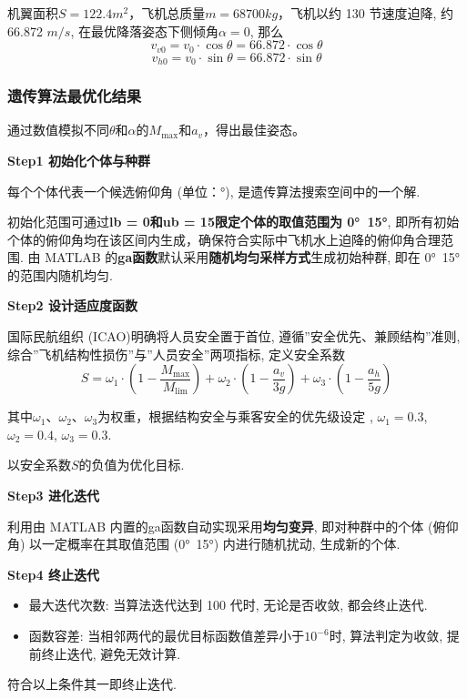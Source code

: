 \documentclass{cumcmthesis}
\begin{document}
机翼面积$S=122.4 m^2$，飞机总质量$ m = 68700 kg $，飞机以约 130 节速度迫降, 约66.872 $m/s$, 在最优降落姿态下侧倾角$\alpha = 0 $, 那么
\begin{equation}
    v_{v0} = v_0 \cdot \cos\theta = 66.872 \cdot \cos\theta
    \label{specfica_v}
\end{equation}
\begin{equation}
     v_{h0} = v_0 \cdot \sin\theta = 66.872 \cdot \sin\theta
    \label{specfica_h}
\end{equation}


\subsubsection{遗传算法最优化结果}


通过数值模拟不同$\theta$和$\alpha$的$M_{\text{max}}$和$a_v$，得出最佳姿态。

\textbf{Step1 初始化个体与种群}

每个个体代表一个候选俯仰角 (单位：°), 是遗传算法搜索空间中的一个解. 

初始化范围可通过\textbf{lb = 0和ub = 15限定个体的取值范围为 0°~15°}, 
即所有初始个体的俯仰角均在该区间内生成，确保符合实际中飞机水上迫降的俯仰角合理范围.  
由 MATLAB 的\textbf{ga函数}默认采用\textbf{随机均匀采样方式}生成初始种群, 即在 0°~15° 的范围内随机均匀. 

\textbf{Step2 设计适应度函数}

国际民航组织 (ICAO)明确将人员安全置于首位, 遵循''安全优先、兼顾结构''准则, 综合''飞机结构性损伤''与''人员安全''两项指标, 
定义安全系数
\begin{equation}
S = \omega_1 \cdot \left(1 - \frac{M_{\text{max}}}{M_{\text{lim}}}\right) + 
\omega_2 \cdot \left(1 - \frac{a_v}{3g}\right) + 
\omega_3 \cdot \left(1 - \frac{a_h}{5g}\right)
\label{FormulaOfS}
\end{equation}

其中$\omega_1$、$\omega_2$、$\omega_3$为权重，根据结构安全与乘客安全的优先级设定
, $\omega_1=0.3$, $\omega_2=0.4$, $\omega_3=0.3$.

以安全系数$S$的负值为优化目标. 

\textbf{Step3 进化迭代}

利用由 MATLAB 内置的ga函数自动实现采用\textbf{均匀变异}, 即对种群中的个体
 (俯仰角) 以一定概率在其取值范围 (0°~15°) 内进行随机扰动, 生成新的个体. 

\textbf{Step4 终止迭代}

\begin{itemize}
\item 最大迭代次数: 当算法迭代达到 100 代时, 无论是否收敛, 都会终止迭代. 

\item 函数容差: 当相邻两代的最优目标函数值差异小于$10^{-6}$时, 算法判定为收敛, 提前终止迭代, 避免无效计算. 
\end{itemize}
符合以上条件其一即终止迭代.
\end{document}
